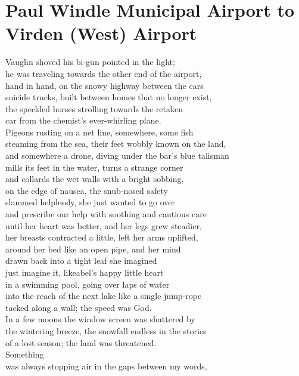 \documentclass[smalldemyvopaper,11pt,twoside,onecolumn,openright,extrafontsizes]{memoir}
\begin{document}
\chapter{Paul Windle Municipal Airport to Virden (West) Airport}
Vaughn shoved his bi-gun pointed in the light;
\\he was traveling towards the other end of the airport,
\\hand in hand, on the snowy highway between the cars
\\suicide trucks, built between homes that no longer exist,
\\the speckled horses strolling towards the retaken
\\car from the chemist's ever-whirling plane.
\\Pigeons rusting on a net line, somewhere, some fish
\\steaming from the sea, their feet wobbly known on the land,
\\and somewhere a drone, diving under the bar's blue talisman
\\mills its feet in the water, turns a strange corner
\\and collards the wet walls with a bright sobbing,
\\on the edge of nausea, the snub-nosed safety
\\slammed helplessly, she just wanted to go over
\\and prescribe our help with soothing and cautious care
\\until her heart was better, and her legs grew steadier,
\\her breasts contracted a little, left her arms uplifted,
\\around her bed like an open pipe, and her mind
\\drawn back into a tight leaf she imagined
\\just imagine it, likeabel's happy little heart
\\in a swimming pool, going over laps of water
\\into the reach of the next lake like a single jump-rope
\\tacked along a wall; the speed was God.
\\In a few moons the window screen was shattered by
\\the wintering breeze, the snowfall endless in the stories
\\of a lost season; the land was threatened.
\\Something
\\was always stopping air in the gaps between my words,
\end{document}
